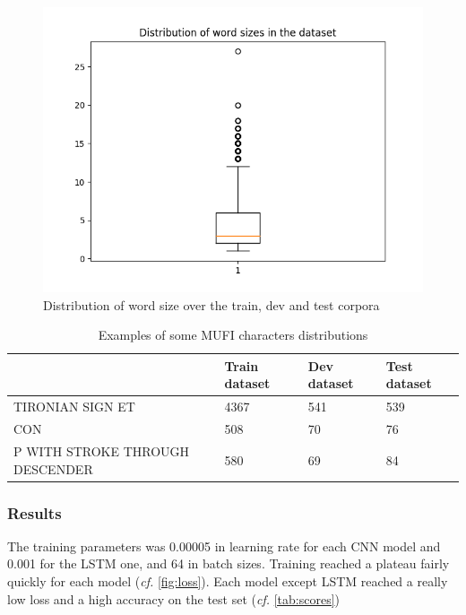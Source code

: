 \documentclass{jdmdh}
\begin{document}
\begin{figure}[!ht]
  \centering
  \includegraphics[width=\linewidth]{length.png}
  \caption{Distribution of word size over the train, dev and test corpora}
  \label{fig:word_sizes}
\end{figure}

\begin{table}[!ht]
\begin{tabular}{llll}
\hline
                                                   & Train dataset & Dev dataset & Test dataset \\ \hline
TIRONIAN SIGN ET                                   & 4367          & 541         & 539          \\
CON                             & 508           & 70          & 76           \\
P WITH STROKE THROUGH DESCENDER & 580           & 69          & 84           \\ \hline
\end{tabular}
  \caption{Examples of some MUFI characters distributions}
  \label{tab:mufi_examples}
\end{table}

\subsubsection{Results}

The training parameters was 0.00005 in learning rate for each CNN model and 0.001 for the LSTM one, and 64 in batch sizes. Training reached a plateau fairly quickly for each model (\textit{cf.} \ref{fig:loss}). Each model except LSTM reached a really low loss and a high accuracy on the test set (\textit{cf.} \ref{tab:scores})
\end{document}
